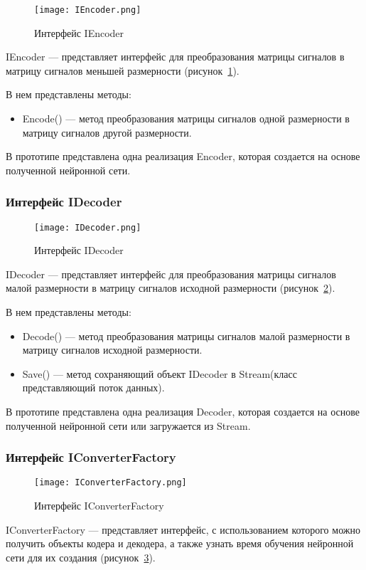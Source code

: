 \begin{figure}[ht]
\centering
  \texttt{[image: IEncoder.png]}
  \caption{ Интерфейс IEncoder }
  \label{fig:iencoder}
\end{figure}
IEncoder --- представляет интерфейс для преобразования матрицы сигналов в матрицу сигналов меньшей размерности (рисунок~\ref{fig:iencoder}).

В нем представлены методы:
\begin{itemize}
  \item Encode() --- метод преобразования матрицы сигналов одной размерности в матрицу сигналов другой размерности.
\end{itemize}

В прототипе представлена одна реализация Encoder, которая создается на основе полученной нейронной сети.

\subsubsection{Интерфейс IDecoder}
\label{subsub:development:types:idecoder}

\begin{figure}[ht]
\centering
  \texttt{[image: IDecoder.png]}
  \caption{ Интерфейс IDecoder }
  \label{fig:idecoder}
\end{figure}
IDecoder --- представляет интерфейс для преобразования матрицы сигналов малой размерности в матрицу сигналов исходной размерности (рисунок~\ref{fig:idecoder}).

В нем представлены методы:
\begin{itemize}
  \item Decode() --- метод преобразования матрицы сигналов малой размерности в матрицу сигналов исходной размерности.
  \item Save() --- метод сохраняющий объект IDecoder в Stream(класс представляющий поток данных).
\end{itemize}

В прототипе представлена одна реализация Decoder, которая создается на основе полученной нейронной сети или загружается из Stream.

\subsubsection{Интерфейс IConverterFactory}
\label{subsub:development:types:iconverterfactory}

\begin{figure}[ht]
\centering
  \texttt{[image: IConverterFactory.png]}
  \caption{ Интерфейс IConverterFactory }
  \label{fig:iconverterfactory}
\end{figure}
IConverterFactory --- представляет интерфейс, с использованием которого можно получить объекты кодера и декодера,
а также узнать время обучения нейронной сети для их создания (рисунок~\ref{fig:iconverterfactory}).

